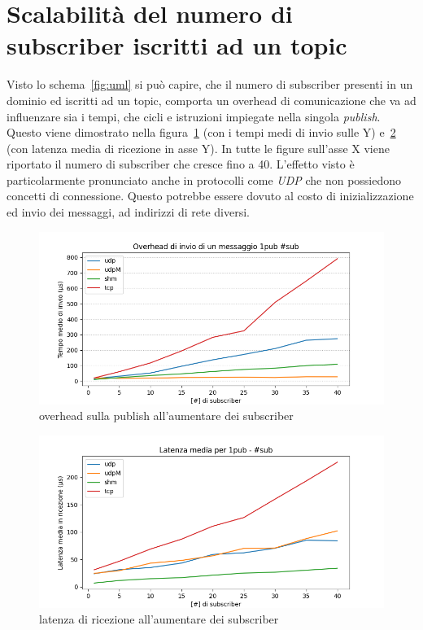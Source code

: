 \section{Scalabilità del numero di subscriber iscritti ad un topic}
Visto lo schema~\ref{fig:uml} si può capire, che il numero di subscriber presenti in un dominio ed iscritti ad un topic, comporta un overhead di comunicazione che va ad influenzare sia i tempi, che cicli e istruzioni impiegate nella singola \emph{publish}. Questo viene dimostrato nella figura~\ref{fig:test3_overhead} (con i tempi medi di invio sulle Y) e~\ref{fig:test3_latenza} (con latenza media di ricezione in asse Y). In tutte le figure sull'asse X viene riportato il numero di subscriber che cresce fino a 40. L'effetto visto è particolarmente pronunciato anche in protocolli come \emph{UDP} che non possiedono concetti di connessione. Questo potrebbe essere dovuto al costo di inizializzazione ed invio dei messaggi, ad indirizzi di rete diversi.
\begin{figure}[H]
    \centering
    \includegraphics[width=\textwidth]{./results/test3_sending_multiplesub.png} %
    \caption{overhead sulla publish all'aumentare dei subscriber}\label{fig:test3_overhead}
\end{figure}
\begin{figure}[H]
    \centering
    \includegraphics[width=\textwidth]{./results/test3_sendingreceiving_multiplesub.png} 
    \caption{latenza di ricezione all'aumentare dei subscriber}\label{fig:test3_latenza}
\end{figure}

